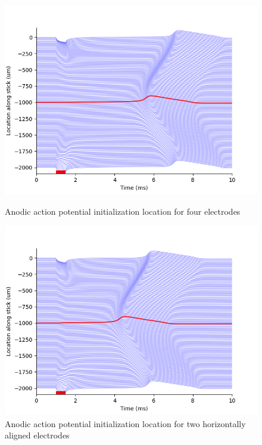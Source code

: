 \documentclass{article}
\begin{document}
    \begin{figure}[htbp]
        \centering
        \begin{minipage}[b]{0.3\textwidth}
            \includegraphics[width=\textwidth]{FE_all_anodic_loc}
            \caption{Anodic action potential initialization location for four electrodes}
            \label{fig:FE_all_anodic_loc}
        \end{minipage}
        \hfill
        \begin{minipage}[b]{0.3\textwidth}
            \includegraphics[width=\textwidth]{FE_horizontal_anodic_loc}
            \caption{Anodic action potential initialization location for two horizontally aligned electrodes}
            \label{fig:FE_horizontal_anodic_loc}

\end{minipage}
\end{figure}
\end{document}
